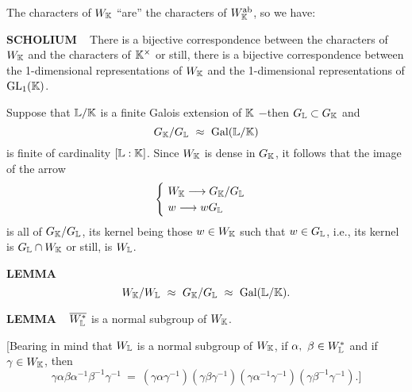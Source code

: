The characters of $W_{\mathbb{K}}$ ``are'' the characters of $W_{\mathbb{K}}^{\text{ab}}$, so we have:

\vspace{0.2cm}

\begin{x}{\small\bf SCHOLIUM} \ %
There is a bijective correspondence between the characters of $W_{\mathbb{K}}$ and the characters of $\mathbb{K}^\times$ or still, there is a 
bijective correspondence between the 1-dimensional representations of $W_{\mathbb{K}}$ and the 
1-dimensional representations of $\text{GL}_1(\mathbb{K})$.
\end{x}

\vspace{0.1cm}


Suppose that $\mathbb{L} / \mathbb{K}$ is a finite Galois extension of $\mathbb{K}$ $-$then $G_{\mathbb{L}} \subset G_{\mathbb{K}}$ and 
\[
G_{\mathbb{K}} / G_{\mathbb{L}} \ \approx \ \text{Gal}(\mathbb{L} / \mathbb{K})
\]
is finite of cardinality 
$[\mathbb{L}:\mathbb{K}]$.  Since $W_{\mathbb{K}}$ is dense in $G_{\mathbb{K}}$, it follows that the image of the arrow
\[
\begin{cases}
 \ W_{\mathbb{K}} \longrightarrow G_{\mathbb{K}} / G_{\mathbb{L}}\\
 \ w \longrightarrow w G_{\mathbb{L}}
\end{cases}
\]
is all of $G_{\mathbb{K}} / G_{\mathbb{L}}$, its kernel being those $w \in W_{\mathbb{K}}$ such that $w \in G_{\mathbb{L}}$, i.e., its kernel is 
$G_{\mathbb{L}} \cap W_{\mathbb{K}}$ or still, is $W_{\mathbb{L}}$.

\vspace{0.2cm}

\begin{x}{\small\bf LEMMA} \ %
\[
W_\K / W_\LL \ \approx \ G_\K / G_\LL \ \approx \ \Gal(\LL / \K).
\]
\end{x}
\vspace{0.1cm}

\begin{x}{\small\bf LEMMA} \ %
$\overline{W_{\mathbb{L}}^*}$ is a normal subgroup of $W_{\mathbb{K}}$.
\end{x}

\vspace{0.1cm}


[Bearing in mind that $W_{\mathbb{L}}$ is a normal subgroup of $W_{\mathbb{K}}$, if $\alpha, \ \beta \in W_{\mathbb{L}}^*$ and if $\gamma \in W_{\mathbb{K}}$, then 
\[
\gamma \alpha \beta \alpha^{-1} \beta^{-1} \gamma^{-1} \ = \ 
(\gamma \alpha \gamma^{-1}) (\gamma \beta \gamma^{-1}) 
(\gamma \alpha^{-1} \gamma^{-1}) (\gamma \beta^{-1} \gamma^{-1}).]
\]

\vspace{0.1cm}

